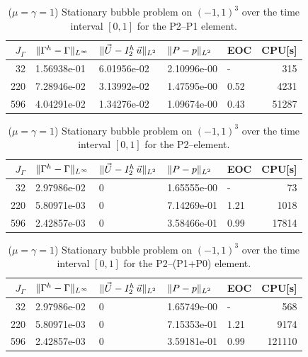 \begin{table}
\center
\begin{tabular}{rllllr}
\hline
$J_\Gamma$ & $\|\Gamma^h - \Gamma\|_{L^\infty}$ & $\|\vec U - I^h_{2}\,\vec u\|_{L^2}$ & $\|P - p\|_{L^2}$ & EOC & CPU[s] \\
\hline
 32 & 1.56938e-01 & 6.01956e-02 & 2.10996e-00 &    - &   315 \\
220 & 7.28946e-02 & 3.13992e-02 & 1.47595e-00 & 0.52 &  4231 \\
596 & 4.04291e-02 & 1.34276e-02 & 1.09674e-00 & 0.43 & 51287 \\
\hline
\end{tabular}
\caption[Stokes 3d stationary bubble errors P2--P1]
{($\mu=\gamma=1$) Stationary bubble problem on $(-1,1)^3$ over the time
interval $[0,1]$ for the P2--P1 element.}
\label{tab:stokes_stationary_3d_p2p1}
\end{table}
\begin{table}
\center
\begin{tabular}{rllllr}
\hline
$J_\Gamma$ & $\|\Gamma^h - \Gamma\|_{L^\infty}$ & $\|\vec U - I^h_{2}\,\vec u\|_{L^2}$ & $\|P - p\|_{L^2}$ & EOC & CPU[s] \\
\hline
 32 & 2.97986e-02 & 0 & 1.65555e-00 &    - &    73 \\
220 & 5.80971e-03 & 0 & 7.14269e-01 & 1.21 &  1018 \\
596 & 2.42857e-03 & 0 & 3.58466e-01 & 0.99 & 17814 \\
\hline
\end{tabular}
\caption[Stokes 3d stationary bubble errors P2--\pdg]
{($\mu=\gamma=1$) Stationary bubble problem on $(-1,1)^3$ over the time
interval $[0,1]$ for the P2--\pdg element.}
\label{tab:stokes_stationary_3d_p2p1dg}
\end{table}
\begin{table}
\center
\begin{tabular}{rllllr}
\hline
$J_\Gamma$ & $\|\Gamma^h - \Gamma\|_{L^\infty}$ & $\|\vec U - I^h_{2}\,\vec u\|_{L^2}$ & $\|P - p\|_{L^2}$ & EOC & CPU[s] \\
\hline
 32 & 2.97986e-02 & 0 & 1.65749e-00 &    - &    568 \\
220 & 5.80971e-03 & 0 & 7.15353e-01 & 1.21 &   9174 \\
596 & 2.42857e-03 & 0 & 3.59181e-01 & 0.99 & 121110 \\
\hline
\end{tabular}
\caption[Stokes 3d stationary bubble errors P2--(P1+P0)]
{($\mu=\gamma=1$) Stationary bubble problem on $(-1,1)^3$ over the time
interval $[0,1]$ for the P2--(P1+P0) element.}
\label{tab:stokes_stationary_3d_p2p1p0}
\end{table}

